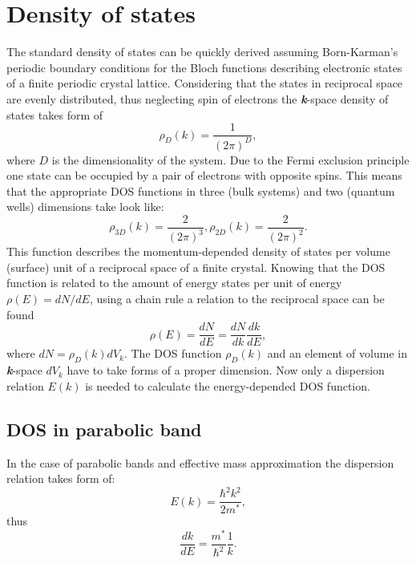 \documentclass[titlepage,a4paper]{book}
\newcommand{\wciecie}{\quad\phantom{v}}
\begin{document}
\section{Density of states}
\label{section:DOS}
\wciecie
The standard density of states can be quickly derived assuming Born-Karman's periodic boundary conditions for the Bloch functions describing electronic states of a finite periodic crystal lattice. Considering that the states in reciprocal space are evenly distributed, thus neglecting spin of electrons the \textbf{\textit{k}}-space density of states takes form of
\begin{equation}
\label{eq:DOS_k}
\rho_{D} (k) = \frac{1}{(2\pi)^{D}},
\end{equation}
where $D$ is the dimensionality of the system. Due to the Fermi exclusion principle one state can be occupied by a pair of electrons with opposite spins. This means that the appropriate DOS functions in three (bulk systems) and two (quantum wells) dimensions take look like:
\begin{equation}
\label{eq:DOS_2}
\rho_{3D} (k) = \frac{2}{(2\pi)^{3}}, \rho_{2D} (k) = \frac{2}{(2\pi)^{2}}.
\end{equation}
This function describes the momentum-depended density of states per volume (surface) unit of a reciprocal space of a finite crystal. Knowing that the DOS function is related to the amount of energy states per unit of energy $\rho (E) = dN/dE$, using a chain rule a relation to the reciprocal space can be found
\begin{equation}
\label{eq:DOS_3}
\rho (E) = \frac{dN}{dE} = \frac{dN}{dk}\frac{dk}{dE},
\end{equation}
where $dN = \rho_D (k) dV_k$. The DOS function $\rho_D (k)$ and an element of volume in \textbf{\textit{k}}-space $dV_k$ have to take forms of a proper dimension. Now only a dispersion relation $E(k)$ is needed to calculate the energy-depended DOS function. 
 
\subsection{DOS in parabolic band}
\wciecie
In the case of parabolic bands and effective mass approximation the dispersion relation takes form of:
\begin{equation}
\label{eq:DOS_4}
E(k) = \frac{\hbar^2k^2}{2m^*},
\end{equation}
thus
\begin{equation}
\label{eq:DOS_5}
\frac{dk}{dE} = \frac{m^*}{\hbar^2} \frac{1}{k}.
\end{equation}
\end{document}
